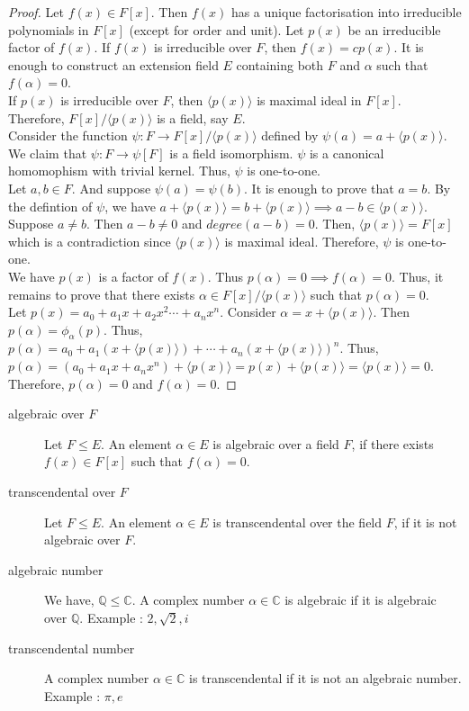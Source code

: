 \begin{proof}
	Let $f(x) \in F[x]$. Then $f(x)$ has a unique factorisation into irreducible polynomials in $F[x]$ (except for order and unit). Let $p(x)$ be an irreducible factor of $f(x)$. If $f(x)$ is irreducible over $F$, then $f(x) = cp(x)$. It is enough to construct an extension field $E$ containing both $F$ and $\alpha$ such that $f(\alpha) = 0$.\\

	If $p(x)$ is irreducible over $F$, then $\langle p(x) \rangle$ is maximal ideal in $F[x]$. Therefore, $F[x]/\langle p(x) \rangle$ is a field, say $E$.\\

	Consider the function $\psi : F \to F[x]/\langle p(x) \rangle$ defined by $\psi(a) = a+\langle p(x) \rangle$. We claim that $\psi : F \to \psi[F]$ is a field isomorphism. $\psi$ is a canonical homomophism with trivial kernel. Thus, $\psi$ is one-to-one.\\

	Let $a,b \in F$. And suppose $\psi(a) = \psi(b)$. It is enough to prove that $a = b$. By the defintion of $\psi$, we have $a+\langle p(x) \rangle = b + \langle p(x) \rangle \implies a-b \in \langle p(x) \rangle$. Suppose $a \ne b$. Then $a-b \ne 0$ and $degree(a-b) = 0$. Then, $\langle p(x) \rangle = F[x]$ which is a contradiction since $\langle p(x) \rangle$ is maximal ideal. Therefore, $\psi$ is one-to-one.\\
	
	We have $p(x)$ is a factor of $f(x)$. Thus $p(\alpha) = 0 \implies f(\alpha) = 0$. Thus, it remains to prove that there exists $\alpha \in F[x]/\langle p(x) \rangle$ such that $p(\alpha) = 0$.\\

	Let $p(x) = a_0 + a_1x + a_2 x^2\cdots + a_n x^n$. Consider $\alpha = x + \langle p(x) \rangle$. Then $p(\alpha) = \phi_\alpha(p)$. Thus, $p(\alpha) = a_0 + a_1(x+\langle p(x) \rangle) + \cdots + a_n(x + \langle p(x) \rangle)^n$. Thus, $p(\alpha) = (a_0+a_1x + a_n x^n) + \langle p(x) \rangle = p(x) + \langle p(x) \rangle = \langle p(x) \rangle = 0$. Therefore, $p(\alpha) = 0$ and $f(\alpha) = 0$.
\end{proof}

\begin{description}
	\item[algebraic over $F$] Let $F \le E$. An element $\alpha \in E$ is algebraic over a field $F$, if there exists $f(x) \in F[x]$ such that $f(\alpha) = 0$.
	\item[transcendental over $F$] Let $F \le E$. An element $\alpha \in E$ is transcendental over the field $F$, if it is not algebraic over $F$.
	\item[algebraic number] We have, $\mathbb{Q} \le \mathbb{C}$. A complex number $\alpha \in \mathbb{C}$ is algebraic if  it is algebraic over $\mathbb{Q}$. Example : $2,\sqrt{2},i$
	\item[transcendental number] A complex number $\alpha \in \mathbb{C}$ is transcendental if it is not an algebraic number. Example : $\pi,e$
\end{description}


